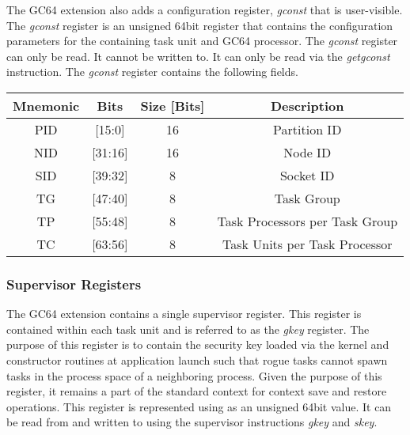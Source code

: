 \documentclass{article}
\begin{document}
The GC64 extension also adds a configuration register, \emph{gconst} that is user-visible.  The \emph{gconst} register is an unsigned 64bit register that contains the configuration parameters for the containing task unit and GC64 processor.  The \emph{gconst} register can only be read.  It cannot be written to.  It can only be read via the \emph{getgconst} instruction.  The \emph{gconst} register contains the following fields.  

\begin{center}
\begin{tabular}{| c | c | c | c |}
\hline
Mnemonic & Bits & Size [Bits] & Description \\ 
\hline \hline
PID & [15:0] & 16 & Partition ID \\
\hline
NID & [31:16] & 16 & Node ID \\
\hline
SID & [39:32] & 8 & Socket ID \\
\hline
TG & [47:40] & 8 & Task Group \\
\hline 
TP & [55:48] & 8 & Task Processors per Task Group \\
\hline 
TC & [63:56] & 8 & Task Units per Task Processor \\
\hline 

\end{tabular}
\end{center} 

\begin{center}
\end{center}

\subsubsection{Supervisor Registers}

The GC64 extension contains a single supervisor register.  This register is contained within each task unit and is referred to as the \emph{gkey} register.  The purpose of this register is to contain the security key loaded via the kernel and constructor routines at application launch such that rogue tasks cannot spawn tasks in the process space of a neighboring process.  Given the purpose of this register, it remains a part of the standard context for context save and restore operations.  This register is represented using as an unsigned 64bit value.  It can be read from and written to using the supervisor instructions \emph{gkey} and \emph{skey}.  

\begin{center}
\end{center}
\end{document}
